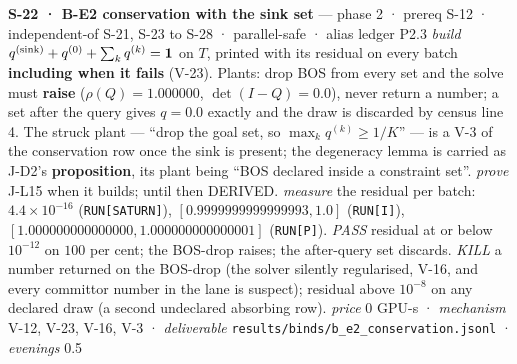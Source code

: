 \documentclass[11pt,a4paper]{article}
\theoremstyle{plain}
\theoremstyle{definition}
\theoremstyle{remark}
\begin{document}
\textbf{S-22 · B-E2 conservation with the sink set} --- phase 2 · prereq
S-12 · independent-of S-21, S-23 to S-28 · parallel-safe · alias ledger
P2.3 \emph{build} \(q^{({\rm sink})}+q^{(0)}+\sum_k q^{(k)}=\mathbf 1\)
on \(T\), printed with its residual on every batch \textbf{including
when it fails} (V-23). Plants: drop BOS from every set and the solve
must \textbf{raise} (\(\rho(Q)=1.000000\), \(\det(I-Q)=0.0\)), never
return a number; a set after the query gives \(q=0.0\) exactly and the
draw is discarded by census line 4. The struck plant --- ``drop the goal
set, so \(\max_k q^{(k)}\ge1/K\)'' --- is a V-3 of the conservation row
once the sink is present; the degeneracy lemma is carried as J-D2's
\textbf{proposition}, its plant being ``BOS declared inside a constraint
set''. \emph{prove} J-L15 when it builds; until then DERIVED.
\emph{measure} the residual per batch: \(4.4\times10^{-16}\)
(\texttt{RUN{[}SATURN{]}}), \([0.9999999999999993, 1.0]\)
(\texttt{RUN{[}I{]}}), \([1.000000000000000, 1.000000000000001]\)
(\texttt{RUN{[}P{]}}). \emph{PASS} residual at or below \(10^{-12}\) on
\(100\) per cent; the BOS-drop raises; the after-query set discards.
\emph{KILL} a number returned on the BOS-drop (the solver silently
regularised, V-16, and every committor number in the lane is suspect);
residual above \(10^{-8}\) on any declared draw (a second undeclared
absorbing row). \emph{price} \(0\) GPU-s · \emph{mechanism} V-12, V-23,
V-16, V-3 · \emph{deliverable}
\texttt{results/binds/b\_e2\_conservation.jsonl} · \emph{evenings} 0.5
\end{document}
